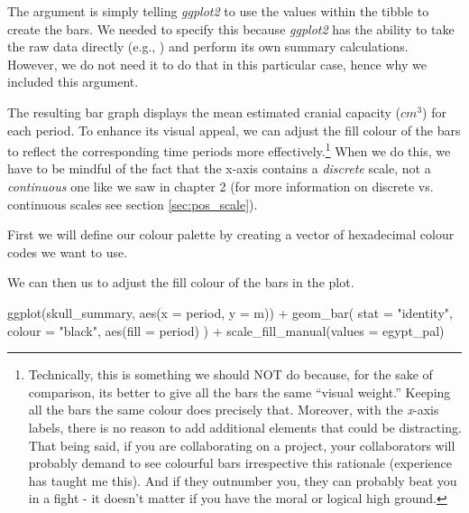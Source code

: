 The argument  is simply telling \textit{ggplot2} to use the values within the  tibble to create the bars.  We needed to specify this because \textit{ggplot2} has the ability to take the raw data directly (e.g., ) and perform its own summary calculations. However, we do not need it to do that in this particular case, hence why we included this argument.

The resulting bar graph displays the mean estimated cranial capacity ($cm^3$) for each period. To enhance its visual appeal, we can adjust the fill colour of the bars to reflect the corresponding time periods more effectively.\footnote{Technically, this is something we should NOT do because, for the sake of comparison, its better to give all the bars the same ``visual weight.'' Keeping all the bars the same colour does precisely that. Moreover, with the \textit{x}-axis labels, there is no reason to add additional elements that could be distracting. That being said, if you are collaborating on a project, your collaborators will probably demand to see colourful bars irrespective this rationale (experience has taught me this). And if they outnumber you, they can probably beat you in a fight - it doesn't matter if you have the moral or logical high ground.} When we do this, we have to be mindful of the fact that the x-axis contains a \textit{discrete} scale, not a \textit{continuous} one like we saw in chapter 2 (for more information on discrete vs. continuous scales see section \ref{sec:pos_scale}).

First we will define our colour palette by creating a vector of hexadecimal colour codes we want to use.


\vspace{1em}

\noindent
We can then us  to adjust the fill colour of the bars in the plot.

\begin{inR}
ggplot(skull_summary, aes(x = period, y = m)) +
  geom_bar(
    stat = "identity",
    colour = "black",
    aes(fill = period)
  ) +
  scale_fill_manual(values = egypt_pal)
\end{inR}

\vspace{2em}

